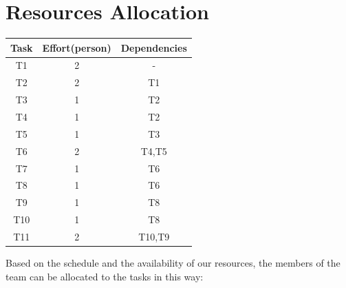 \documentclass[18pt,oneside,a4paper, titlepage]{article}
\begin{document}
\section{Resources Allocation}
	\vspace{0.8cm}
	\begin{center}
		\centering
		\begin{tabular}{c c c }
			\hline \textbf{Task} & \textbf{Effort(person)} & \textbf{Dependencies} \\[0.1cm]
			\hline		T1 & 2 & -\\[0.1cm]
			\hline		T2 & 2 & T1\\[0.1cm]
			\hline		T3 & 1 & T2\\[0.1cm]
			\hline		T4 & 1 & T2\\[0.1cm]
			\hline		T5 & 1 & T3\\[0.1cm]
			\hline		T6 & 2 & T4,T5\\[0.1cm]
			\hline		T7 & 1 & T6\\[0.1cm]
			\hline		T8 & 1 & T6\\[0.1cm]
			\hline		T9 & 1 & T8\\[0.1cm]
			\hline		T10 & 1 & T8\\[0.1cm]
			\hline		T11 & 2 & T10,T9\\[0.1cm]
			\hline
		\end{tabular}
	\end{center}
	\vspace{0.8cm}
	Based on the schedule and the availability of our resources, the members of the team can be allocated to the tasks in this way:
\end{document}
